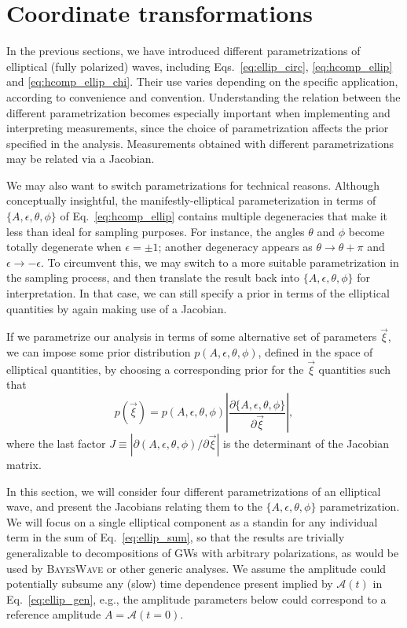 \documentclass[aps,prd,twocolumn,superscriptaddress,preprintnumbers,floatfix,nofootinbib]{revtex4-2}
\newcommand*{\eq}[1]{Eq.~\eqref{eq:#1}}
\begin{document}
\section{Coordinate transformations}

In the previous sections, we have introduced different parametrizations of elliptical (fully polarized) waves, including Eqs.~\eqref{eq:ellip_circ}, \eqref{eq:hcomp_ellip} and \eqref{eq:hcomp_ellip_chi}.
Their use varies depending on the specific application, according to convenience and convention.
Understanding the relation between the different parametrization becomes especially important when implementing and interpreting measurements, since the choice of parametrization affects the prior specified in the analysis.
Measurements obtained with different parametrizations may be related via a Jacobian.

We may also want to switch parametrizations for technical reasons.
Although conceptually insightful, the manifestly-elliptical parameterization in terms of $\{A, \epsilon, \theta, \phi\}$ of \eq{hcomp_ellip} contains multiple degeneracies that make it less than ideal for sampling purposes.
For instance, the angles $\theta$ and $\phi$ become totally degenerate when $\epsilon = \pm 1$; another degeneracy appears as $\theta \to \theta + \pi$ and $\epsilon \to - \epsilon$.
To circumvent this, we may switch to a more suitable parametrization in the sampling process, and then translate the result back into $\{A, \epsilon, \theta, \phi\}$ for interpretation.
In that case, we can still specify a prior in terms of the elliptical quantities by again making use of a Jacobian.

If we parametrize our analysis in terms of some alternative set of parameters $\vec{\xi}$, we can impose some prior distribution $p({A, \epsilon, \theta, \phi})$, defined in the space of elliptical quantities, by choosing a corresponding prior for the $\vec{\xi}$ quantities such that
\begin{equation}
p \left( \vec{\xi} \right) = p \left( A, \epsilon, \theta, \phi \right) \left| \frac{\partial \{A, \epsilon, \theta, \phi\}}{\partial \vec{\xi}} \right| ,
\end{equation}
where the last factor $J \equiv | \partial (A, \epsilon, \theta, \phi)/\partial \vec{\xi} |$ is the determinant of the Jacobian matrix.

In this section, we will consider four different parametrizations of an elliptical wave, and present the Jacobians relating them to the $\{A, \epsilon, \theta, \phi\}$ parametrization.
We will focus on a single elliptical component as a standin for any individual term in the sum of Eq.~\eqref{eq:ellip_sum}, so that the results are trivially generalizable to decompositions of GWs with arbitrary polarizations, as would be used by \textsc{BayesWave} or other generic analyses.
We assume the amplitude could potentially subsume any (slow) time dependence present implied by $\mathcal{A}(t)$ in Eq.~\eqref{eq:ellip_gen}, e.g., the amplitude parameters below could correspond to a reference amplitude $A=\mathcal{A}(t=0)$.
\end{document}
